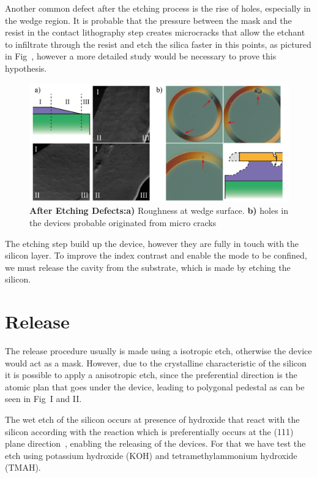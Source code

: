 Another common defect after the etching process is the rise of holes, especially in the wedge region. It is probable that the pressure between the mask and the resist in the contact lithography step creates microcracks that allow the etchant to infiltrate through the resist and etch the silica faster in this points, as pictured in Fig~, however a more detailed study would be necessary to prove this hypothesis. 

\begin{figure}[!ht]
    \centering
    \includegraphics[width = 16cm]{figuras/Dissertation_etchin_def.jpg}
    \caption{\textbf{After Etching Defects:a)} Roughness at wedge surface. \textbf{b)} holes in the devices probable originated from micro cracks}
    \label{fig:ethc_wrong}
\end{figure}

The etching step build up the device, however they are fully in touch with the silicon layer. To improve the index contrast and enable the mode to be confined, we must release the cavity from the substrate, which is made by etching the silicon.

\section{Release}

The release procedure usually is made using a isotropic etch, otherwise the device would act as a mask. However, due to the crystalline characteristic of the silicon it is possible to apply a anisotropic etch, since the preferential direction is the atomic plan that goes under the device, leading to polygonal pedestal as can be seen in Fig~I and II.

The wet etch of the silicon occurs at presence of hydroxide that react with the silicon according with the reaction
which is preferentially occurs at the (111) plane direction~\cite{Glembocki_1985}, enabling the releasing of the devices. For that we have test the etch using potassium hydroxide (KOH) and tetramethylammonium hydroxide (TMAH).

